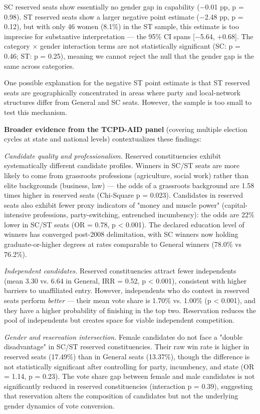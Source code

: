 \documentclass[
]{article}
\begin{document}
SC reserved seats show essentially no gender gap in capability ($-$0.01 pp, p = 0.98). ST reserved seats show a larger negative point estimate ($-$2.48 pp, p = 0.12), but with only 46 women (8.1\%) in the ST sample, this estimate is too imprecise for substantive interpretation --- the 95\% CI spans {[}$-$5.64, +0.68{]}. The category $\times$ gender interaction terms are not statistically significant (SC: p = 0.46; ST: p = 0.25), meaning we cannot reject the null that the gender gap is the same across categories.

One possible explanation for the negative ST point estimate is that ST reserved seats are geographically concentrated in areas where party and local-network structures differ from General and SC seats. However, the sample is too small to test this mechanism.

\textbf{Broader evidence from the TCPD-AID panel} (covering multiple election cycles at state and national levels) contextualizes these findings:

\emph{Candidate quality and professionalism.} Reserved constituencies exhibit systematically different candidate profiles. Winners in SC/ST seats are more likely to come from grassroots professions (agriculture, social work) rather than elite backgrounds (business, law) --- the odds of a grassroots background are 1.58 times higher in reserved seats (Chi-Square p = 0.023). Candidates in reserved seats also exhibit fewer proxy indicators of "money and muscle power" (capital-intensive professions, party-switching, entrenched incumbency): the odds are 22\% lower in SC/ST seats (OR = 0.78, p \textless{} 0.001). The declared education level of winners has converged post-2008 delimitation, with SC winners now holding graduate-or-higher degrees at rates comparable to General winners (78.0\% vs 76.2\%).

\emph{Independent candidates.} Reserved constituencies attract fewer independents (mean 3.30 vs. 6.64 in General, IRR = 0.52, p \textless{} 0.001), consistent with higher barriers to unaffiliated entry. However, independents who do contest in reserved seats perform \emph{better} --- their mean vote share is 1.70\% vs. 1.00\% (p \textless{} 0.001), and they have a higher probability of finishing in the top two. Reservation reduces the pool of independents but creates space for viable independent competition.

\emph{Gender and reservation intersection.} Female candidates do not face a "double disadvantage" in SC/ST reserved constituencies. Their raw win rate is higher in reserved seats (17.49\%) than in General seats (13.37\%), though the difference is not statistically significant after controlling for party, incumbency, and state (OR = 1.14, p = 0.23). The vote share gap between female and male candidates is not significantly reduced in reserved constituencies (interaction p = 0.39), suggesting that reservation alters the composition of candidates but not the underlying gender dynamics of vote conversion.
\end{document}
